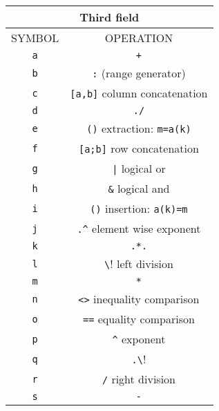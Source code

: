 \begin{center}
\begin{tabular}{|c|c|}
\hline 
\multicolumn{2}{|c|}{Third field}
\\ \hline \hline
SYMBOL & OPERATION 
\\ \hline \hline
\verb!a! & \verb!+!  \\ \hline

\verb!b! & \verb!:!  (range generator)\\ \hline

\verb!c! & \verb![a,b]! column concatenation  \\ \hline

\verb!d! & \verb!./!  \\ \hline

\verb!e! & \verb!()! extraction: \verb!m=a(k)!  \\ \hline

\verb!f! & \verb![a;b]! row concatenation  \\ \hline

\verb!g! & \verb!|! logical or  \\ \hline

\verb!h! & \verb!&! logical and  \\ \hline

\verb!i! & \verb!()! insertion:  \verb!a(k)=m!  \\ \hline

\verb!j! & \verb!.^! element wise exponent  \\ \hline

\verb!k! & \verb!.*.!  \\ \hline

\verb!l! & \verb!\!  left division \\ \hline

\verb!m! & \verb!*!  \\ \hline

\verb!n! & \verb!<>! inequality comparison \\ \hline

\verb!o! & \verb!==! equality comparison \\ \hline

\verb!p! & \verb!^!  exponent \\ \hline

\verb!q! & \verb!.\!  \\ \hline

\verb!r! & \verb!/!  right division \\ \hline

\verb!s! & \verb!-!  \\ \hline


\end{tabular}
\end{center}
